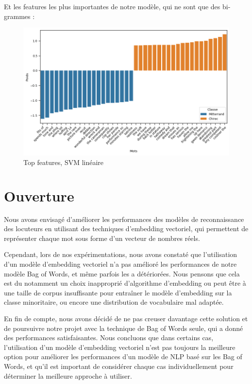 \documentclass{article}
\begin{document}
Et les features les plus importantes de notre modèle, qui ne sont que des bi-grammes :

\begin{figure}[H]
    \centering
    \includegraphics[width=\textwidth]{./src/movies/param_analysis_SVC.png}
    \caption{Top features, SVM linéaire}
    \label{features_svm_movies}
\end{figure}

\section{Ouverture}

Nous avons envisagé d'améliorer les performances des modèles de reconnaissance des locuteurs en utilisant des techniques d'embedding vectoriel, qui permettent de représenter chaque mot sous forme d'un vecteur de nombres réels.

Cependant, lors de nos expérimentations, nous avons constaté que l'utilisation d'un modèle d'embedding vectoriel n'a pas amélioré les performances de notre modèle Bag of Words, et même parfois les a détériorées. Nous pensons que cela est du notamment un choix inapproprié d'algorithme d'embedding ou peut être à une taille de corpus insuffisante pour entraîner le modèle d'embedding sur la classe minoritaire, ou encore une distribution de vocabulaire mal adaptée.

En fin de compte, nous avons décidé de ne pas creuser davantage cette solution et de poursuivre notre projet avec la technique de Bag of Words seule, qui a donné des performances satisfaisantes. Nous concluons que dans certains cas, l'utilisation d'un modèle d'embedding vectoriel n'est pas toujours la meilleure option pour améliorer les performances d'un modèle de NLP basé sur les Bag of Words, et qu'il est important de considérer chaque cas individuellement pour déterminer la meilleure approche à utiliser.
\end{document}

